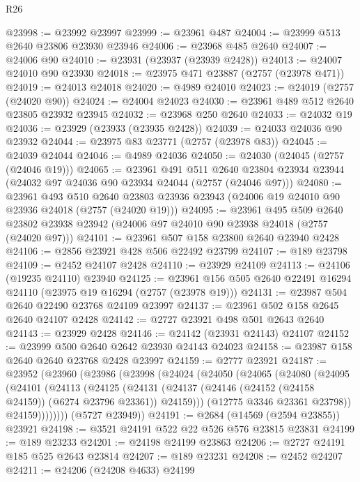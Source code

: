\begin{lexlean}{R26}
\begin{coremodule}
@23998 := @23992 @23997
@23999 := @23961 @487
@24004 := @23999 @513 @2640 @23806 @23930 @23946
@24006 := @23968 @485 @2640
@24007 := @24006 @90
@24010 := @23931 (@23937 (@23939 @2428))
@24013 := @24007 @24010 @90 @23930
@24018 := @23975 @471 @23887 (@2757 (@23978 @471))
@24019 := @24013 @24018
@24020 := @4989 @24010
@24023 := @24019 (@2757 (@24020 @90))
@24024 := @24004 @24023
@24030 := @23961 @489 @512 @2640 @23805 @23932 @23945
@24032 := @23968 @250 @2640
@24033 := @24032 @19
@24036 := @23929 (@23933 (@23935 @2428))
@24039 := @24033 @24036 @90 @23932
@24044 := @23975 @83 @23771 (@2757 (@23978 @83))
@24045 := @24039 @24044
@24046 := @4989 @24036
@24050 := @24030 (@24045 (@2757 (@24046 @19)))
@24065 := @23961
    @491
    @511
    @2640
    @23804
    @23934
    @23944
    (@24032 @97 @24036 @90 @23934 @24044 (@2757 (@24046 @97)))
@24080 := @23961
    @493
    @510
    @2640
    @23803
    @23936
    @23943
    (@24006 @19 @24010 @90 @23936 @24018 (@2757 (@24020 @19)))
@24095 := @23961
    @495
    @509
    @2640
    @23802
    @23938
    @23942
    (@24006 @97 @24010 @90 @23938 @24018 (@2757 (@24020 @97)))
@24101 := @23961 @507 @158 @23800 @2640 @23940 @2428
@24106 := @2856 @23921 @428 @506 @22492 @23799
@24107 := @189 @23798
@24109 := @2452 @24107 @2428
@24110 := @23929 @24109
@24113 := @24106 (@19235 @24110) @23940
@24125 := @23961 @156 @505 @2640 @22491 @16294 @24110 (@23975 @19 @16294 (@2757 (@23978 @19)))
@24131 := @23987 @504 @2640 @22490 @23768 @24109 @23997
@24137 := @23961 @502 @158 @2645 @2640 @24107 @2428
@24142 := @2727 @23921 @498 @501 @2643 @2640
@24143 := @23929 @2428
@24146 := @24142 (@23931 @24143) @24107
@24152 := @23999 @500 @2640 @2642 @23930 @24143 @24023
@24158 := @23987 @158 @2640 @2640 @23768 @2428 @23997
@24159 := @2777 @23921
@24187 := @23952
    (@23960
      (@23986
        (@23998
          (@24024
            (@24050
              (@24065
                (@24080
                  (@24095
                    (@24101
                      (@24113
                        (@24125
                          (@24131
                            (@24137
                              (@24146 (@24152 (@24158 @24159)) (@6274 @23796 @23361))
                              @24159)))
                        (@12775 @3346 @23361 @23798))
                      @24159))))))))
      (@5727 @23949))
@24191 := @2684 (@14569 (@2594 @23855)) @23921
@24198 := @3521 @24191 @522 @22 @526 @576 @23815 @23831
@24199 := @189 @23233
@24201 := @24198 @24199 @23863
@24206 := @2727 @24191 @185 @525 @2643 @23814
@24207 := @189 @23231
@24208 := @2452 @24207
@24211 := @24206 (@24208 @4633) @24199

\end{coremodule}
\end{lexlean}
